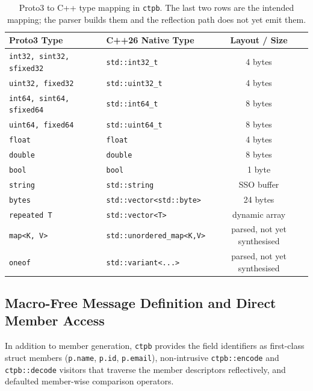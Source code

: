 \begin{table}[ht]
\centering
\caption{Proto3 to C++ type mapping in \texttt{ctpb}. The last two rows are the intended mapping; the parser builds them and the reflection path does not yet emit them.}
\label{tab:type_mapping}
\renewcommand{\arraystretch}{1.15}
\setlength{\tabcolsep}{2.5pt}
\scriptsize
\begin{tabular}{|l|l|c|}
\hline
\textbf{Proto3 Type} & \textbf{C++26 Native Type} & \textbf{Layout / Size} \\ \hline
\texttt{int32, sint32, sfixed32} & \texttt{std::int32\_t} & 4 bytes \\ \hline
\texttt{uint32, fixed32} & \texttt{std::uint32\_t} & 4 bytes \\ \hline
\texttt{int64, sint64, sfixed64} & \texttt{std::int64\_t} & 8 bytes \\ \hline
\texttt{uint64, fixed64} & \texttt{std::uint64\_t} & 8 bytes \\ \hline
\texttt{float} & \texttt{float} & 4 bytes \\ \hline
\texttt{double} & \texttt{double} & 8 bytes \\ \hline
\texttt{bool} & \texttt{bool} & 1 byte \\ \hline
\texttt{string} & \texttt{std::string} & SSO buffer \\ \hline
\texttt{bytes} & \texttt{std::vector<std::byte>} & 24 bytes \\ \hline
\texttt{repeated T} & \texttt{std::vector<T>} & dynamic array \\ \hline
\texttt{map<K, V>} & \texttt{std::unordered\_map<K,V>} & parsed, not yet synthesised \\ \hline
\texttt{oneof} & \texttt{std::variant<...>} & parsed, not yet synthesised \\ \hline
\end{tabular}
\end{table}

\subsection{Macro-Free Message Definition and Direct Member Access}
In addition to member generation, \texttt{ctpb} provides the field identifiers as first-class struct members (\texttt{p.name}, \texttt{p.id}, \texttt{p.email}), non-intrusive \texttt{ctpb::encode} and \texttt{ctpb::decode} visitors that traverse the member descriptors reflectively, and defaulted member-wise comparison operators.

